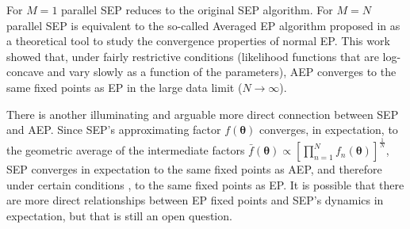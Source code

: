 %
%

For $M=1$ parallel SEP reduces to the original SEP algorithm. For $M=N$ parallel SEP is equivalent to the so-called Averaged EP algorithm proposed in \cite{barthelme:aep} as a theoretical tool to study the convergence properties of normal EP. This work showed that, under fairly restrictive conditions (likelihood functions that are log-concave and vary slowly as a function of the parameters), AEP converges to the same fixed points as EP in the large data limit ($N \rightarrow \infty$).

There is another illuminating and arguable more direct connection between SEP and AEP. Since SEP's approximating factor $f(\bm{\theta})$ converges, in expectation, to the geometric average of the intermediate factors $\bar{f}(\bm{\theta}) \propto [\prod_{n=1}^N f_n(\bm{\theta})]^{\frac{1}{N}}$, SEP converges in expectation to the same fixed points as AEP, and therefore under certain conditions \cite{barthelme:aep}, to the same fixed points as EP. 
%
It is possible that there are more direct relationships between EP fixed points and SEP's dynamics in expectation, but that is still an open question.








